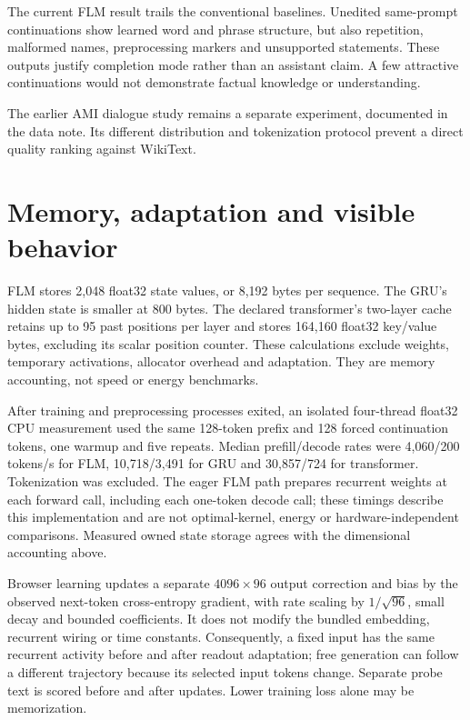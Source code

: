 \documentclass[10pt]{article}
\begin{document}
The current FLM result trails the conventional baselines. Unedited same-prompt continuations show learned word and phrase structure, but also repetition, malformed names, preprocessing markers and unsupported statements. These outputs justify completion mode rather than an assistant claim. A few attractive continuations would not demonstrate factual knowledge or understanding.

The earlier AMI dialogue study remains a separate experiment, documented in the data note. Its different distribution and tokenization protocol prevent a direct quality ranking against WikiText.



\section{Memory, adaptation and visible behavior}
FLM stores 2,048 float32 state values, or 8,192 bytes per sequence. The GRU's hidden state is smaller at 800 bytes. The declared transformer's two-layer cache retains up to 95 past positions per layer and stores 164,160 float32 key/value bytes, excluding its scalar position counter. These calculations exclude weights, temporary activations, allocator overhead and adaptation. They are memory accounting, not speed or energy benchmarks.

After training and preprocessing processes exited, an isolated four-thread float32 CPU measurement used the same 128-token prefix and 128 forced continuation tokens, one warmup and five repeats. Median prefill/decode rates were 4,060/200 tokens/s for FLM, 10,718/3,491 for GRU and 30,857/724 for transformer. Tokenization was excluded. The eager FLM path prepares recurrent weights at each forward call, including each one-token decode call; these timings describe this implementation and are not optimal-kernel, energy or hardware-independent comparisons. Measured owned state storage agrees with the dimensional accounting above.

Browser learning updates a separate $4096\times96$ output correction and bias by the observed next-token cross-entropy gradient, with rate scaling by $1/\sqrt{96}$, small decay and bounded coefficients. It does not modify the bundled embedding, recurrent wiring or time constants. Consequently, a fixed input has the same recurrent activity before and after readout adaptation; free generation can follow a different trajectory because its selected input tokens change. Separate probe text is scored before and after updates. Lower training loss alone may be memorization.
\end{document}
